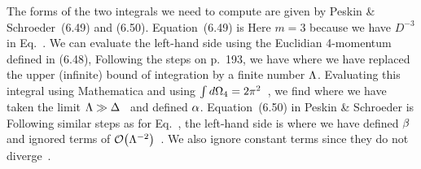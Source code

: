 \documentclass[11pt]{article}
\begin{document}
{	The forms of the two integrals we need to compute are given by Peskin \& Schroeder~(6.49) and (6.50).  Equation~(6.49) is
	Here $m = 3$ because we have $D^{-3}$ in Eq.~.  We can evaluate the left-hand side using the Euclidian 4-momentum defined in (6.48),
	Following the steps on p.~193, we have
	where we have replaced the upper (infinite) bound of integration by a finite number $\Lambda$.  Evaluating this integral using Mathematica and using $\int \dd{\Omega_4} = 2 \pi^2$~\cite[p.~193]{Peskin}, we find
	where we have taken the limit $\Lambda \gg \Delta$~\cite[p.~218]{Peskin} and defined $\alpha$.  Equation~(6.50) in Peskin \& Schroeder is
	Following similar steps as for Eq.~, the left-hand side is
	where we have defined $\beta$ and ignored terms of $\order{\Lam^{-2}}$~\cite[p.~218]{Peskin}.  We also ignore constant terms since they do not diverge~\cite[p.~196]{Peskin}.
	
}
\end{document}

